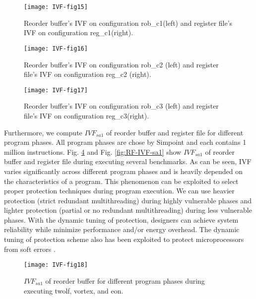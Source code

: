 \begin{figure}[t]
    \centering
    \texttt{[image: IVF-fig15]}\\
    \caption{Reorder buffer's IVF on configuration rob\_c1(left) and register file's IVF on configuration reg\_c1(right).}
    \label{fig:ROB-IVF-C1}
\end{figure}


\begin{figure}[t]
    \centering
    \texttt{[image: IVF-fig16]}\\
    \caption{Reorder buffer's IVF on configuration rob\_c2 (left) and register file's IVF on configuration reg\_c2 (right).}
    \label{fig:ROB-IVF-C2}
\end{figure}

\begin{figure}[t]
    \centering
    \texttt{[image: IVF-fig17]}\\
    \caption{Reorder buffer's IVF on configuration rob\_c3 (left) and register file's IVF on configuration reg\_c3(right).}
    \label{fig:ROB-IVF-C3}
\end{figure}

Furthermore, we compute $IVF_{sa1}$ of reorder buffer and register file for different program phases. All program phases are chose by Simpoint \cite{sherwood2002automatically} and each contains 1 million instructions. Fig. \ref{fig:ROB-IVF-sa1} and Fig. \ref{fig:RF-IVF-sa1} show $IVF_{sa1}$ of reorder buffer and register file during executing several benchmarks. As can be seen, IVF varies significantly across different program phases and is heavily depended on the characteristics of a program. This phenomenon can be exploited to select proper protection techniques during program execution. We can use heavier protection (strict redundant multithreading) during highly vulnerable phases and lighter protection (partial or no redundant multithreading) during less vulnerable phases. With the dynamic tuning of protection, designers can achieve system reliability while minimize performance and/or energy overhead. The dynamic tuning of protection scheme also has been exploited to protect microprocessors from soft errors \cite{walcott2007dynamic}.

\begin{figure}[t]
    \centering
    \texttt{[image: IVF-fig18]}\\
    \caption{$IVF_{sa1}$ of reorder buffer for different program phases during executing twolf, vortex, and eon.}
    \label{fig:ROB-IVF-sa1}
\end{figure}

